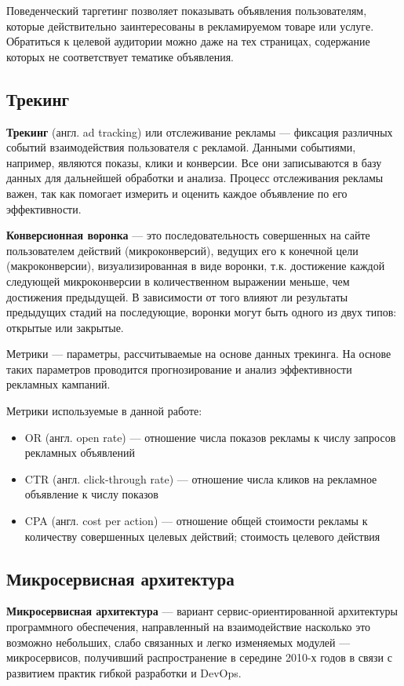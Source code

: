 \documentclass[times]{itmo-student-thesis}
\begin{document}
Поведенческий таргетинг позволяет показывать объявления пользователям, которые действительно заинтересованы в рекламируемом товаре или услуге. Обратиться к целевой аудитории можно даже на тех страницах, содержание которых не соответствует тематике объявления.

\subsection{Трекинг}

\textbf{Трекинг} (англ. ad tracking) или отслеживание рекламы — фиксация различных событий взаимодействия пользователя с рекламой. Данными событиями, например, являются показы, клики и конверсии. Все они записываются в базу данных для дальнейшей обработки и анализа. Процесс отслеживания рекламы важен, так как помогает измерить и оценить каждое объявление по его эффективности.

\textbf{Конверсионная воронка}  — это последовательность совершенных на сайте пользователем действий (микроконверсий), ведущих его к конечной цели (макроконверсии), визуализированная в виде воронки, т.к. достижение каждой следующей микроконверсии в количественном выражении меньше, чем достижения предыдущей. В зависимости от того влияют ли результаты предыдущих стадий на последующие, воронки могут быть одного из двух типов: открытые или закрытые.

Метрики — параметры, рассчитываемые на основе данных трекинга. На основе таких параметров проводится прогнозирование и анализ эффективности рекламных кампаний. 

Метрики используемые в данной работе:
\begin{itemize}
\item OR (англ. open rate) — отношение числа показов рекламы к числу запросов рекламных объявлений
\item CTR (англ. click-through rate) — отношение числа кликов на рекламное объявление к числу показов
\item CPA (англ. cost per action) — отношение общей стоимости рекламы к количеству совершенных целевых действий; стоимость целевого действия
\end{itemize}

\subsection{Микросервисная архитектура}

\textbf{Микросервисная архитектура} — вариант сервис-ориентированной архитектуры программного обеспечения, направленный на взаимодействие насколько это возможно небольших, слабо связанных и легко изменяемых модулей — микросервисов, получивший распространение в середине 2010-х годов в связи с развитием практик гибкой разработки и DevOps.
\end{document}
